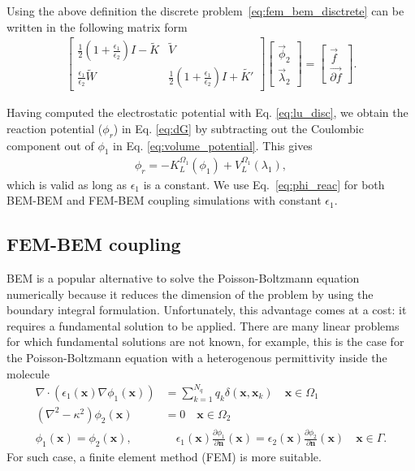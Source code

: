 Using the above definition the discrete problem~\eqref{eq:fem_bem_disctrete} can be written in the following matrix form
\begin{align*}
\begin{bmatrix}
 \tfrac12 \left(1+\tfrac{\epsilon_1}{\epsilon_2}\right) I - \widetilde{K}  & \widetilde{V}  \\  
 \tfrac{\epsilon_1}{\epsilon_2} \widetilde{W} & \tfrac12 \left(1+\tfrac{\epsilon_1}{\epsilon_2}\right) I + \widetilde{K'}
\end{bmatrix}
\begin{bmatrix}
\vec{\phi}_2 \\
\vec{\lambda}_2 
\end{bmatrix}
= 
\begin{bmatrix}
\vec{f} \\  
\vec{\partial f}
\end{bmatrix}.
\end{align*}
%

Having computed the electrostatic potential with Eq. \eqref{eq:lu_disc}, we obtain the reaction potential ($\phi_r$) in Eq. \eqref{eq:dG} by subtracting out the Coulombic component out of $\phi_1$ in Eq. \eqref{eq:volume_potential}. This gives
%
\begin{align} \label{eq:phi_reac}
\phi_{r} = - K_{L}^{\Omega_1}(\phi_1) + V_{L}^{\Omega_1} \left(  \lambda_1  \right),
\end{align}
%
which is valid as long as $\epsilon_1$ is a constant. We use Eq.~\eqref{eq:phi_reac} for both BEM-BEM and FEM-BEM coupling simulations with constant $\epsilon_1$.

\subsection*{\sffamily \normalsize FEM-BEM coupling}


BEM is a popular alternative to solve the Poisson-Boltzmann equation numerically because it reduces the dimension of the problem by using the boundary integral formulation. Unfortunately, this advantage comes at a cost: it requires a fundamental solution to be applied. There are many linear problems for which fundamental solutions are not known, for example, this is the case for the Poisson-Boltzmann equation with a heterogenous permittivity inside the molecule
%
   \begin{align} \label{eq:pbe_vp}
\nabla \cdot \left(\epsilon_1(\mathbf{x}) \nabla \phi_1(\mathbf{x})\right) &= \sum_{k=1}^{N_q} q_k\delta(\mathbf{x},\mathbf{x}_k) \quad  \mathbf{x} \in \Omega_1\nonumber\\
\left(\nabla^2 - \kappa^2\right)\phi_2(\mathbf{x})  &= 0 \quad\mathbf{x}\in\Omega_2\nonumber\\
\phi_1(\mathbf{x})  = \phi_2(\mathbf{x}),  &\quad \epsilon_1(\mathbf{x})\frac{\partial\phi_1}{\partial\mathbf{n}}(\mathbf{x})  = \epsilon_2(\mathbf{x})\frac{\partial\phi_2}{\partial\mathbf{n}}(\mathbf{x})  \quad \mathbf{x}\in \Gamma. 
\end{align}
%
For such case, a finite element method (FEM) is more suitable.

